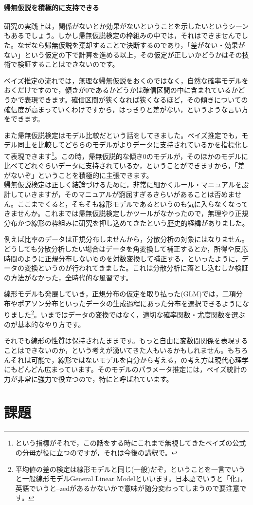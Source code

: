 \documentclass{ltjsarticle}
\begin{document}
\paragraph{帰無仮説を積極的に支持できる}
研究の実践上は，関係がないとか効果がないということを示したいというシーンもあるでしょう。しかし帰無仮説検定の枠組みの中では，それはできませんでした。なぜなら帰無仮説を棄却することで決断するのであり，「差がない・効果がない」という仮定の下で計算を進める以上，その仮定が正しいかどうかはその技術で検証することはできないのです。

ベイズ推定の流れでは，無理な帰無仮説をおくのではなく，自然な確率モデルをおくだけですので，傾きが0であるかどうかは確信区間の中に含まれているかどうかで表現できます。確信区間が狭くなれば狭くなるほど，その傾きについての確信度が高まっていくわけですから，はっきりと差がない，というような言い方をできます。

また帰無仮説検定はモデル比較だという話をしてきました。ベイズ推定でも，モデル同士を比較してどちらのモデルがよりデータに支持されているかを指標化して表現できます\footnote{という指標がそれで，この話をする時にこれまで無視してきたベイズの公式の分母が役に立つのですが，それは今後の講釈で。}。この時，帰無仮説的な傾き0のモデルが，そのほかのモデルに比べてどれぐらいデータに支持されているか，ということができますから，「差がないぞ」ということを積極的に主張できます。\\

帰無仮説検定は正しく結論づけるために，非常に細かくルール・マニュアルを設計していきますが，そのマニュアルが窮屈すぎるきらいがあることは否めません。ここまでくると，そもそも線形モデルであるというのも気に入らなくなってきませんか。これまでは帰無仮説検定しかツールがなかったので，無理やり正規分布かつ線形の枠組みに研究を押し込めてきたという歴史的経緯がありました。

例えば比率のデータは正規分布しませんから，分散分析の対象にはなりません。どうしても分散分析したい場合はデータを角変換して補正するとか，所得や反応時間のように正規分布しないものを対数変換して補正する，といったように，データの変換というのが行われてきました。これは分散分析に落とし込むしか検証の方法がなかった，全時代的な風習です。

線形モデルも発展していき，正規分布の仮定を取り払った(GLM)では，二項分布やポアソン分布といったデータの生成過程にあった分布を選択できるようになりました\footnote{平均値の差の検定は線形モデルと同じ(一般)だぞ，ということを一言でいうと一般線形モデルGeneral Linear Modelといいます。日本語でいうと「化」，英語でいうと--zedがあるかないかで意味が随分変わってしまうので要注意です。}。いまではデータの変換ではなく，適切な確率関数・尤度関数を選ぶのが基本的なやり方です。

それでも線形の性質は保持されたままです。もっと自由に変数間関係を表現することはできないのか，という考えが湧いてきた人もいるかもしれません。もちろんそれは可能で，線形ではないモデルを自分から考える，の考え方は現代心理学にもどんどん広まっています。そのモデルのパラメータ推定には，ベイズ統計の力が非常に強力で役立つので，特にと呼ばれています。

\section{課題}
\end{document}

